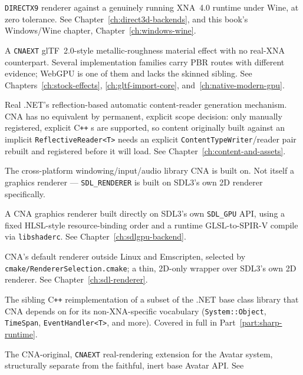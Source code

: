 \begin{description}
  \texttt{DIRECTX9} renderer against a genuinely running XNA~4.0 runtime under Wine, at zero tolerance. See
  Chapter~\ref{ch:direct3d-backends}, and this book's Windows/Wine chapter, Chapter~\ref{ch:windows-wine}.
\item[PbrEffect] A \texttt{CNAEXT} glTF~2.0-style metallic-roughness material effect with no
  real-XNA counterpart. Several implementation families carry PBR routes with different evidence;
  WebGPU is one of them and lacks the skinned sibling. See Chapters~\ref{ch:stock-effects},
  \ref{ch:gltf-import-core}, and~\ref{ch:native-modern-gpu}.
\item[ReflectiveReader<T>] Real .NET's reflection-based automatic content-reader generation
  mechanism. CNA has no equivalent by permanent, explicit scope decision: only manually
  registered, explicit C\texttt{++} s are supported, so content
  originally built against an implicit \texttt{ReflectiveReader<T>} needs an explicit
  \texttt{ContentTypeWriter}/reader pair rebuilt and registered before it will load. See
  Chapter~\ref{ch:content-and-assets}.
\item[SDL3] The cross-platform windowing/input/audio library CNA is built on. Not itself a
  graphics renderer --- \texttt{SDL\_RENDERER} is built on
  SDL3's own 2D renderer specifically.
\item[SDL\_GPU] A CNA graphics renderer built directly on SDL3's own \texttt{SDL\_GPU} API, using a
  fixed HLSL-style resource-binding order and a runtime GLSL-to-SPIR-V compile via
  \texttt{libshaderc}. See Chapter~\ref{ch:sdlgpu-backend}.
\item[SDL\_RENDERER] CNA's default renderer outside Linux and Emscripten, selected by
  \texttt{cmake/RendererSelection.cmake};
  a thin, 2D-only wrapper over SDL3's own 2D renderer. See Chapter~\ref{ch:sdl-renderer}.
\item[SharpRuntime / sharp-runtime] The sibling C\texttt{++} reimplementation of a subset of
  the .NET base class library that CNA depends on for its non-XNA-specific vocabulary
  (\texttt{System::Object}, \texttt{TimeSpan}, \texttt{EventHandler<T>}, and more). Covered in
  full in Part~\ref{part:sharp-runtime}.
\item[SkinnedModelEXT] The CNA-original, \texttt{CNAEXT} real-rendering extension for the
  Avatar system, structurally separate from the faithful, inert base Avatar API. See

\end{description}

